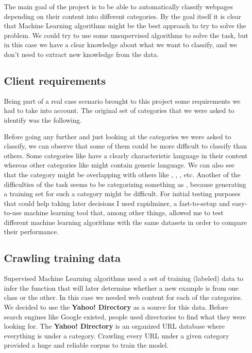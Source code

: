 
The main goal of the project is to be able to automatically classify webpages depending on their content into different categories. 
By the goal itself it is clear that Machine Learning algorithms might be the best approach to try to solve the problem. We could try to use some unsupervised algorithms to solve the task,
but in this case we have a clear knowledge about what we want to classify, and we don't need to extract new knowledge from the data.

\subsection{Client requirements}

Being part of a real case scenario brought to this project some requirements we had to take into account. The original set of categories that we were asked to identify was the following.


Before going any further and just looking at the categories we were asked to classify, we can observe that some of them could be more difficult to classify than others.
Some categories like  have a clearly characteristic language in their content whereas other categories like  might contain generic language.
We can also see that the category  might be overlapping with others like , , , etc. 
Another of the difficulties of the task seems to be categorizing something as , because generating a training set for such a category might be difficult. 
For initial testing purposes that could help taking later decisions I used rapidminer\cite{rapidminer}, a fast-to-setup and easy-to-use machine learning tool that, among other things, allowed me to test different
machine learning algorithms with the same datasets in order to compare their performance.

\subsection{Crawling training data}
Supervised Machine Learning algorithms need a set of training (labeled) data to infer the function that will later determine whether a new example is from one class or the other. In this case we needed
web content for each of the categories. We decided to use the {\bf Yahoo! Directory}\cite{yahoo} as a source for this data.
Before search engines like Google existed, people used directories to find what they were looking for. The {\bf Yahoo! Directory} is an organized URL database where everything is under a category. 
Crawling every URL under a given category provided a huge and reliable corpus to train the model.


